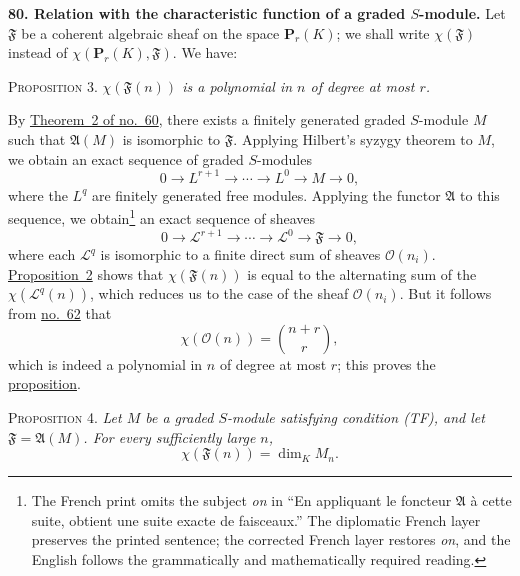 
\medskip
{}\label{fac:III:6:no:80}
\textbf{80. Relation with the characteristic function of a graded
$S$-module.}
Let $\mathfrak F$ be a coherent algebraic sheaf on the space
$\mathbf P_r(K)$; we shall write $\chi(\mathfrak F)$ instead of
$\chi(\mathbf P_r(K),\mathfrak F)$. We have:

\label{fac:III:6:no:80:prop:3}
\textsc{Proposition 3.} \textit{$\chi(\mathfrak F(n))$ is a polynomial
in $n$ of degree at most $r$.}

By \hyperref[fac:III:2:no:60:theorem:2]{Theorem~2 of no.~60}, there
exists a finitely generated graded $S$-module $M$ such that
$\mathfrak A(M)$ is isomorphic to $\mathfrak F$. Applying Hilbert's
syzygy theorem to $M$, we obtain an exact sequence of graded
$S$-modules
\label{fac:III:6:no:80:prop:3:module-resolution}
\[
0\longrightarrow L^{r+1}\longrightarrow\cdots\longrightarrow L^0
\longrightarrow M\longrightarrow0,
\]
where the $L^q$ are finitely generated free modules. Applying the
functor $\mathfrak A$ to this sequence, we obtain\footnote{The French
print omits the subject \emph{on} in ``En appliquant le foncteur
$\mathfrak A$ \`a cette suite, obtient une suite exacte de faisceaux.''
The diplomatic French layer preserves the printed sentence; the
corrected French layer restores \emph{on}, and the English follows the
grammatically and mathematically required reading.} an exact sequence
of sheaves
\label{fac:III:6:no:80:prop:3:sheaf-resolution}
\[
0\longrightarrow\mathcal L^{r+1}\longrightarrow\cdots
\longrightarrow\mathcal L^0\longrightarrow\mathfrak F
\longrightarrow0,
\]
where each $\mathcal L^q$ is isomorphic to a finite direct sum of
sheaves $\mathcal O(n_i)$. \hyperref[fac:III:6:no:79:prop:2]{Proposition~2}
shows that $\chi(\mathfrak F(n))$ is equal to the alternating sum of
the $\chi(\mathcal L^q(n))$, which reduces us to the case of the sheaf
$\mathcal O(n_i)$. But it follows from
\hyperref[fac:III:3:no:62]{no.~62} that
\label{fac:III:6:no:80:formula:chi-O-n}
\[
\chi(\mathcal O(n))=\binom{n+r}{r},
\]
which is indeed a polynomial in $n$ of degree at most $r$; this proves
the \hyperref[fac:III:6:no:80:prop:3]{proposition}.

\label{fac:III:6:no:80:prop:4}
\textsc{Proposition 4.} \textit{Let $M$ be a graded $S$-module
satisfying condition \textup{(TF)}, and let
$\mathfrak F=\mathfrak A(M)$. For every sufficiently large $n$,}
\label{fac:III:6:no:80:prop:4:formula}
\[
\chi(\mathfrak F(n))=\dim_K M_n.
\]

